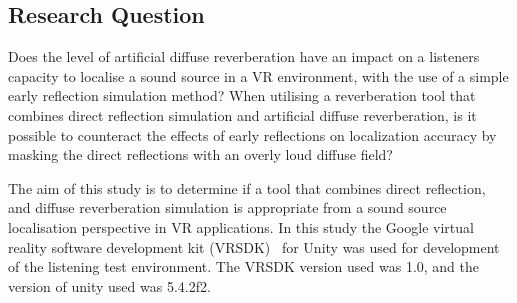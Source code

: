 \documentclass[paper=a4, fontsize=10pt, font=arial]{scrartcl} %
\numberwithin{equation}{section} %
\numberwithin{figure}{section} %
\numberwithin{table}{section} %
\begin{document}
\subsection{Research Question}

Does the level of artificial diffuse reverberation have an impact on a listeners capacity to localise a sound source in a VR environment, with the use of a simple early reflection simulation method? When utilising a reverberation tool that combines direct reflection simulation and artificial diffuse reverberation, is it possible to counteract the effects of early reflections on localization accuracy by masking the direct reflections with an overly loud diffuse field?

The aim of this study is to determine if a tool that combines direct reflection, and diffuse reverberation simulation is appropriate from a sound source localisation perspective in VR applications. In this study the Google virtual reality software development kit (VRSDK)~\cite{googlevr2016} for Unity was used for development of the listening test environment. The VRSDK version used was 1.0, and the version of unity used was 5.4.2f2.

  

\end{document}
